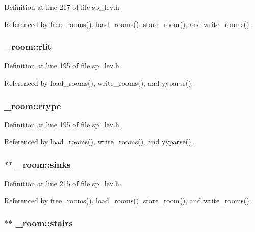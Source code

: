 Definition at line 217 of file sp\+\_\+lev.\+h.



Referenced by free\+\_\+rooms(), load\+\_\+rooms(), store\+\_\+room(), and write\+\_\+rooms().

\hypertarget{struct__room_a4456f444341aea7d18c68cc4400becec}{
\subsubsection[{rlit}]{ \+\_\+room\+::rlit}}\label{struct__room_a4456f444341aea7d18c68cc4400becec}


Definition at line 195 of file sp\+\_\+lev.\+h.



Referenced by load\+\_\+rooms(), write\+\_\+rooms(), and yyparse().

\hypertarget{struct__room_aead16a1e5cdaa60d26ec4be9240ceb94}{
\subsubsection[{rtype}]{ \+\_\+room\+::rtype}}\label{struct__room_aead16a1e5cdaa60d26ec4be9240ceb94}


Definition at line 195 of file sp\+\_\+lev.\+h.



Referenced by load\+\_\+rooms(), write\+\_\+rooms(), and yyparse().

\hypertarget{struct__room_a3e983d2628aef0ea6f2a5eefc6a6759e}{
\subsubsection[{sinks}]{$\ast$$\ast$ \+\_\+room\+::sinks}}\label{struct__room_a3e983d2628aef0ea6f2a5eefc6a6759e}


Definition at line 215 of file sp\+\_\+lev.\+h.



Referenced by free\+\_\+rooms(), load\+\_\+rooms(), store\+\_\+room(), and write\+\_\+rooms().

\hypertarget{struct__room_ae3b0130f66fce4fc798876a6da829e64}{
\subsubsection[{stairs}]{$\ast$$\ast$ \+\_\+room\+::stairs}}\label{struct__room_ae3b0130f66fce4fc798876a6da829e64}


